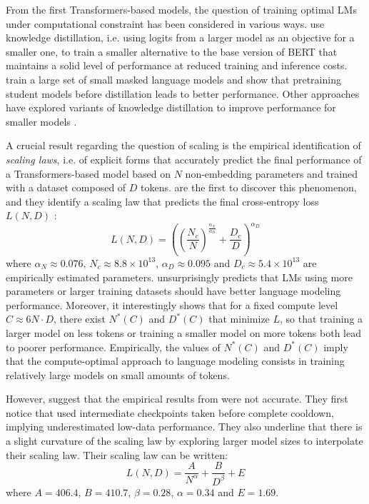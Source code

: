 From the first Transformers-based models, the question of training optimal LMs under computational constraint has been considered in various ways. \citet{sanh2019distilbert} use knowledge distillation, i.e. using logits from a larger model as an objective for a smaller one, to train a smaller alternative to the base version of BERT that maintains a solid level of performance at reduced training and inference costs. \citet{turc2019} train a large set of small masked language models and show that pretraining student models before distillation leads to better performance. Other approaches have explored variants of knowledge distillation to improve performance for smaller models \citep{Fu_Zhou_Yang_Tang_Liu_Liu_Li_2021,sun-etal-2020-contrastive}.

A crucial result regarding the question of scaling is the empirical identification of \textit{scaling laws}, i.e. of explicit forms that accurately predict the final performance of a Transformers-based model based on $N$ non-embedding parameters and trained with a dataset composed of $D$ tokens. \citet{kaplan_scaling} are the first to discover this phenomenon, and they identify a scaling law that predicts the final cross-entropy loss $L(N, D)$ :
\begin{equation}
    \label{eq:kaplan}
L(N, D) = \left( \left(\frac{N_c}{N}\right)^{\frac{\alpha_N}{\alpha_D}} + \frac{D_c}{D}\right)^{\alpha_D}
\end{equation}
where $\alpha_N \approx 0.076$, $N_c \approx 8.8 \times 10^{13}$, $\alpha_D \approx 0.095$ and $D_c \approx 5.4 \times 10^{13}$ are empirically estimated parameters.  unsurprisingly predicts that LMs using more parameters or larger training datasets should have better language modeling performance. Moreover, it interestingly shows that for a fixed compute level $C \approx 6 N \cdot D$, there exist $N^*(C)$ and $D^*(C)$ that minimize $L$, so that training a larger model on less tokens or training a smaller model on more tokens both lead to poorer performance. Empirically, the values of $N^*(C)$ and $D^*(C)$ imply that the compute-optimal approach to language modeling consists in training relatively large models on small amounts of tokens.

However, \citet{chinchilla_scaling} suggest that the empirical results from \citet{kaplan_scaling} were not accurate. They first notice that \citet{kaplan_scaling} used intermediate checkpoints taken before complete cooldown, implying underestimated low-data performance. They also underline that there is a slight curvature of the scaling law by exploring larger model sizes to interpolate their scaling law. Their scaling law can be written:
\begin{equation}
    \label{eq:chinchilla}
    L(N, D) = \frac{A}{N^\alpha} + \frac{B}{D^\beta} + E
\end{equation}
where $A=406.4$, $B=410.7$, $\beta=0.28$, $\alpha=0.34$ and $E=1.69$.

